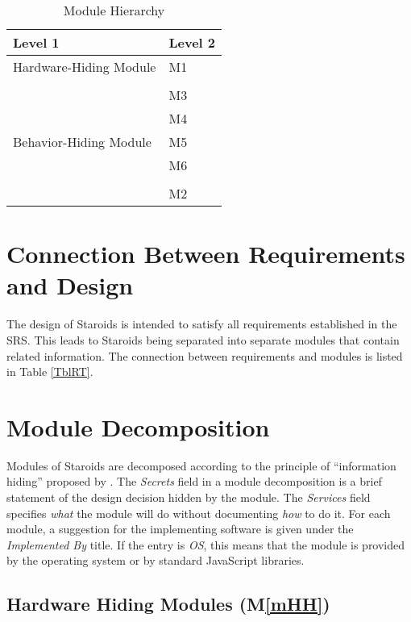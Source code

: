 \documentclass[12pt, titlepage]{article}
\newcommand{\mref}[1]{M\ref{#1}}
\begin{document}
\begin{table}[h!]
\centering
\begin{tabular}{p{} p{}}
\toprule
\textbf{Level 1} & \textbf{Level 2}\\
\midrule

{Hardware-Hiding Module} & M1 \\
\midrule

\multirow{7}{0.3\textwidth}{Behavior-Hiding Module} & \\
& M3 \\
& M4 \\
& M5 \\
& M6 \\
\midrule

\multirow{3}{0.3\textwidth}{Software Decision Module} & \\
& M2 \\
\bottomrule

\end{tabular}
\caption{Module Hierarchy}
\label{TblMH}
\end{table}

\section{Connection Between Requirements and Design} \label{SecConnection}

The design of Staroids is intended to satisfy all requirements established in the SRS. This leads to Staroids being separated into separate modules that contain related information. The connection between requirements and modules is listed in Table \ref{TblRT}.

\section{Module Decomposition} \label{SecMD}

Modules of Staroids are decomposed according to the principle of ``information hiding'' proposed by \citet{ParnasEtAl1984}. The \emph{Secrets} field in a module decomposition is a brief statement of the design decision hidden by the module. The \emph{Services} field specifies \emph{what} the module will do without documenting \emph{how} to do it. For each module, a suggestion for the implementing software is given under the \emph{Implemented By} title. If the entry is \emph{OS}, this means that the module is provided by the operating system or by standard JavaScript libraries.

\subsection{Hardware Hiding Modules (\mref{mHH})}
\end{document}
